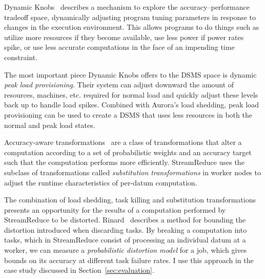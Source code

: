 \documentclass[12pt,twocolumn]{article}
\begin{document}
Dynamic Knobs~\cite{Hoffmann:2011:DKR:1950365.1950390} describes a mechanism to
explore the
accuracy--performance tradeoff space, dynamically adjusting program tuning parameters in
response
to changes in the execution environment. This allows programs to do things such as
utilize more resources if they become available, use less power if power rates spike,
or use less accurate computations in the face of an impending time constraint.

The most important piece Dynamic Knobs offers to the DSMS space is dynamic
\emph{peak load provisioning}. Their system can adjust downward the amount of resources,
machines, etc\@. required for normal load and quickly adjust these levels back up to
handle load spikes. Combined with Aurora's load shedding, peak load provisioning can
be used to create a DSMS that uses less resources in both the normal and peak load
states.

Accuracy-aware transformations~\cite{Zhu:2012:RAP:2103656.2103710} are a class of
transformations
that alter a computation according to a set of probabilistic weights and an accuracy
target such that the computation performs more efficiently. StreamReduce uses the subclass
of transformations called \emph{substitution transformations} in worker nodes to adjust
the runtime characteristics of per-datum computation.

The combination of load shedding, task killing and substitution transformations presents
an opportunity for the results of a computation performed by StreamReduce to be distorted.
Rinard~\cite{Rinard:2006:PAB:1183401.1183447} describes a method for bounding the
distortion
introduced when discarding tasks. By breaking a computation into tasks, which in
StreamReduce
consist of processing an individual datum at a worker, we can measure a
\emph{probabilistic distortion model} for a job, which gives bounds on its accuracy at
different
task failure rates. I use this approach in the case study discussed in
Section~\ref{sec:evaluation}.
\end{document}
